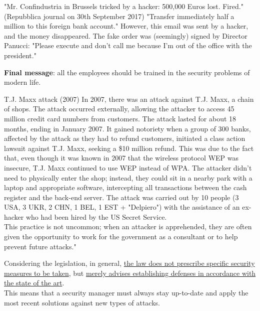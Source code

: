 \begin{casehistory}{"Mr. Confindustria in Brussels tricked by a hacker: 500,000 Euros lost. Fired." (Repubblica journal on 30th September 2017)}
  "Transfer immediately half a million to this foreign bank account." However, this email was sent by a hacker, and the money disappeared. The fake order was (seemingly) signed by Director Panucci: "Please execute and don't call me because I'm out of the office with the president."
\end{casehistory}

\textbf{Final message}: all the employees should be trained in the security problems of modern life.


\begin{casehistory}{T.J. Maxx attack (2007)}
  In 2007, there was an attack against T.J. Maxx, a chain of shops. The attack occurred externally, allowing the attacker to access 45 million credit card numbers from customers. The attack lasted for about 18 months, ending in January 2007. It gained notoriety when a group of 300 banks, affected by the attack as they had to refund customers, initiated a class action lawsuit against T.J. Maxx, seeking a \$10 million refund. This was due to the fact that, even though it was known in 2007 that the wireless protocol WEP was insecure, T.J. Maxx continued to use WEP instead of WPA. The attacker didn't need to physically enter the shop; instead, they could sit in a nearby park with a laptop and appropriate software, intercepting all transactions between the cash register and the back-end server. The attack was carried out by 10 people (3 USA, 3 UKR, 2 CHN, 1 BEL, 1 EST + "Delpiero") with the assistance of an ex-hacker who had been hired by the US Secret Service.\\
  This practice is not uncommon; when an attacker is apprehended, they are often given the opportunity to work for the government as a consultant or to help prevent future attacks."
\end{casehistory}
Considering the legislation, in general, \ul{the law does not prescribe specific security measures to be taken}, but \ul{merely advises establishing defenses in accordance with the state of the art}.\\
This means that a security manager must always stay up-to-date and apply the most recent solutions against new types of attacks.


